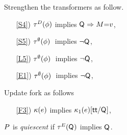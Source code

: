 Strengthen the transformers as follow.
\begin{enumerate}
\item[\ref{S4})]
  $\aTr[\bEvs]\SB0(\aForm)$ implies $\Q{}\limplies\aExp{=}\aVal$,
\item[\ref{S5})]
  $\aTr[\emptyset]\SB0(\aForm)\;$ implies $\lnot\Q{}$,
\item[\ref{L5})]
  $\aTr[\emptyset]\SB0(\aForm)\;$ implies $\lnot\Q{}$,
\item[\ref{E1})]
  $\aTr[\emptyset]\SB0(\aForm)\;$ implies $\lnot\Q{}$,
\end{enumerate}
Update fork as follows
\begin{enumerate}
\item[\ref{F3})]
  $\labelingForm\SB0(\aEv)$ implies $\labelingForm_1(\aEv)[\TRUE/\Q{}]$, 
\end{enumerate}

\begin{definition}
  $\aPS$ is \emph{quiescent} if $\aTr[\aEvs](\Q{})$ implies $\Q{}$.
\end{definition}


